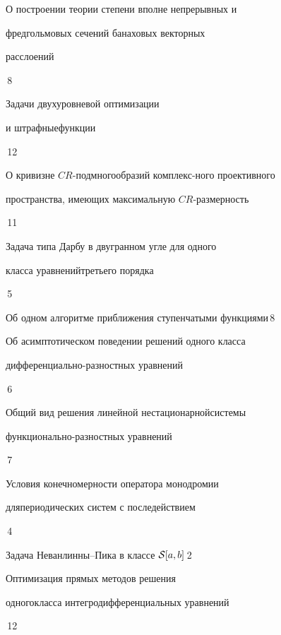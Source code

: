 {О построении теории степени вполне непрерывных и \newline 


фредгольмовых сечений банаховых векторных  


расслоений}{\No\,8}




{Задачи двухуровневой оптимизации


и штрафные\newline функции}{\No\,12}




{О кривизне $CR$-подмногообразий комплекс-\newline ного проективного


пространства, имеющих максимальную $CR$-размерность}{\No\,11}




{Задача типа Дарбу в двугранном угле для одного


класса уравнений\newline третьего порядка}{\No\,5}




{Об одном алгоритме приближения ступенчатыми функциями}{\No\,8}




{Об асимптотическом поведении решений одного класса 


дифференциально-\newline разностных уравнений}{\No\,6}




{Общий вид решения линейной нестационарной\newline системы


функционально-разностных уравнений}{\No\,7}




{Условия конечномерности оператора монодромии


для\newline периодических систем с последействием}{\No\,4}




{Задача Неванлинны--Пика в классе ${\cal S}[a,b]$}{\No\,2}




{Оптимизация прямых методов решения


одного\newline класса интегродифференциальных уравнений}{\No\,12}


